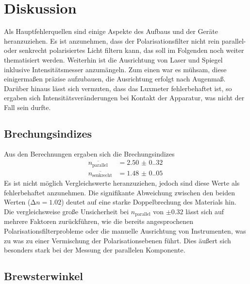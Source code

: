 \section{Diskussion}
\label{sec:Diskussion}

Als Hauptfehlerquellen sind einige Aspekte des Aufbaus und der Geräte heranzuziehen.
Es ist anzunehmen, dass der Polarisationsfilter nicht rein parallel- oder 
senkrecht polarisiertes Licht filtern kann, das soll im Folgenden noch weiter 
thematisiert werden. Weiterhin ist die Ausrichtung von Laser und Spiegel inklusive 
Intensitätsmesser anzumängeln. Zum einen war es mühsam, diese einigermaßen präzise 
aufzubauen, die Ausrichtung erfolgt nach Augenmaß. Darüber hinaus lässt sich 
vermuten, dass das Luxmeter fehlerbehaftet ist, so ergaben sich 
Intensitätsveränderungen bei Kontakt der Apparatur, was nicht der Fall sein 
durfte.

\subsection{Brechungsindizes}
Aus den Berechnungen ergaben sich die Brechungsindizes
\begin{align*}
    \overline{n_\text{parallel}}  &= \qty{2.50(0.32)}{} \\
    \overline{n_\text{senkrecht}} &= \qty{1.48(0.05)}{}
\end{align*}
\noindent Es ist nicht möglich Vergleichswerte heranzuziehen, jedoch sind diese 
Werte als fehlerbehaftet anzunehmen. Die signifikante Abweichung zwischen den
beiden Werten ($\increment n = 1.02$) deutet auf eine starke Doppelbrechung des
Materials hin. Die vergleichsweise große Unsicherheit bei $n_\text{parallel}$
von $\pm 0.32$ lässt sich auf mehrere Faktoren zurückführen, wie die bereits 
angesprochenen Polarisationsfilterprobleme oder die manuelle Ausrichtung von 
Instrumenten, was zu was zu einer Vermischung der Polarisationsebenen führt.
Dies äußert sich besonders stark bei der Messung der parallelen Komponente.

\subsection{Brewsterwinkel}